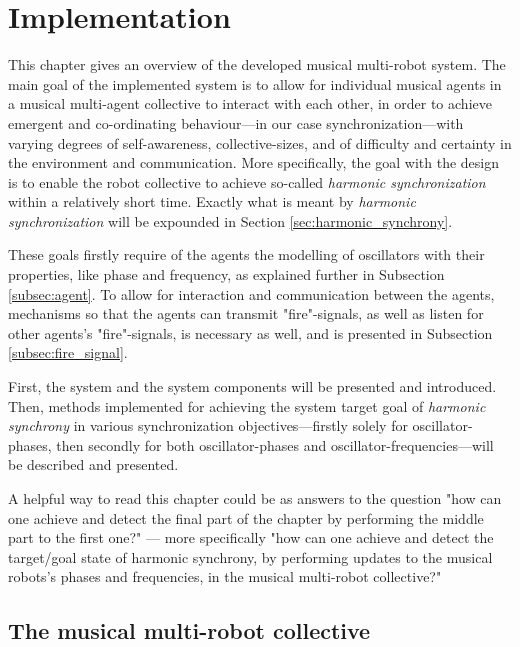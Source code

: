 \chapter{Implementation}
This chapter gives an overview of the developed musical multi-robot system. The main goal of the implemented system is to allow for individual musical agents in a musical multi-agent collective to interact with each other, in order to achieve emergent and co-ordinating behaviour—in our case synchronization—with varying degrees of self-awareness, collective-sizes, and of difficulty and certainty in the environment and communication. More specifically, the goal with the design is to enable the robot collective to achieve so-called \textit{harmonic synchronization} within a relatively short time. Exactly what is meant by \textit{harmonic synchronization} will be expounded in Section \ref{sec:harmonic_synchrony}.

These goals firstly require of the agents the modelling of oscillators with their properties, like phase and frequency, as explained further in Subsection \ref{subsec:agent}. To allow for interaction and communication between the agents, mechanisms so that the agents can transmit "fire"-signals, as well as listen for other agents's "fire"-signals, is necessary as well, and is presented in Subsection \ref{subsec:fire_signal}.

First, the system and the system components will be presented and introduced. Then, methods implemented for achieving the system target goal of \textit{harmonic synchrony} in various synchronization objectives—firstly solely for oscillator-phases, then secondly for both oscillator-phases and oscillator-frequencies—will be described and presented.

A helpful way to read this chapter could be as answers to the question "how can one achieve and detect the final part of the chapter by performing the middle part to the first one?" — more specifically "how can one achieve and detect the target/goal state of harmonic synchrony, by performing updates to the musical robots's phases and frequencies, in the musical multi-robot collective?"




\section{The musical multi-robot collective}
\label{sec:developed_system}

